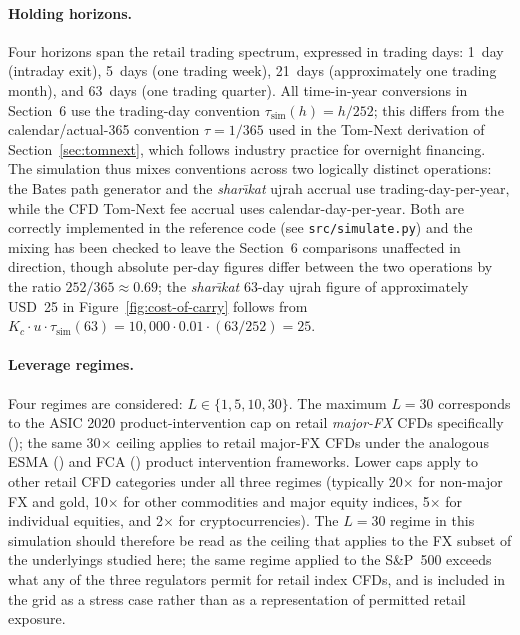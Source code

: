 \documentclass[preprint,12pt,authoryear]{elsarticle}
\theoremstyle{definition}
\begin{document}
\paragraph{Holding horizons.} Four horizons span the retail
trading spectrum, expressed in trading days:
1~day (intraday exit), 5~days (one trading week), 21~days
(approximately one trading month), and 63~days (one trading
quarter). All time-in-year conversions in Section~6 use the
trading-day convention $\tau_{\text{sim}}(h) = h / 252$; this
differs from the calendar/actual-365 convention $\tau = 1/365$
used in the Tom-Next derivation of
Section~\ref{sec:tomnext}, which follows industry practice
for overnight financing. The simulation thus mixes conventions
across two logically distinct operations: the Bates path
generator and the \emph{shar\={\i}kat} ujrah accrual use
trading-day-per-year, while the CFD Tom-Next fee accrual uses
calendar-day-per-year. Both are correctly implemented in the
reference code (see \texttt{src/simulate.py}) and the mixing has
been checked to leave the Section~6 comparisons unaffected in
direction, though absolute per-day figures differ between the
two operations by the ratio $252/365 \approx 0.69$; the
\emph{shar\={\i}kat} 63-day ujrah figure of approximately
USD~25 in Figure~\ref{fig:cost-of-carry} follows from
$K_c \cdot u \cdot \tau_{\text{sim}}(63) = 10{,}000 \cdot 0.01
\cdot (63/252) = 25$.

\paragraph{Leverage regimes.} Four regimes are considered:
$L \in \{1, 5, 10, 30\}$. The maximum $L = 30$ corresponds to the
ASIC 2020 product-intervention cap on retail \emph{major-FX} CFDs
specifically (\citealp{ASIC2020}); the same 30$\times$ ceiling
applies to retail major-FX CFDs under the analogous ESMA
(\citealp{ESMA2018}) and FCA (\citealp{FCA2022}) product
intervention frameworks. Lower caps apply to other retail CFD
categories under all three regimes (typically 20$\times$ for
non-major FX and gold, 10$\times$ for other commodities and major
equity indices, 5$\times$ for individual equities, and 2$\times$
for cryptocurrencies). The $L = 30$ regime in this simulation
should therefore be read as the ceiling that applies to the FX
subset of the underlyings studied here; the same regime applied
to the S\&P~500 exceeds what any of the three regulators permit
for retail index CFDs, and is included in the grid as a stress
case rather than as a representation of permitted retail exposure.
\end{document}
